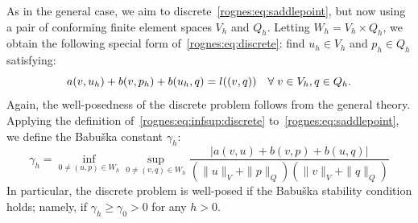 As in the general case, we aim to
discrete~\eqref{rognes:eq:saddlepoint}, but now using a pair of
conforming finite element spaces $V_h$ and $Q_h$. Letting $W_h = V_h
\times Q_h$, we obtain the following special form
of~\eqref{rognes:eq:discrete}: find $u_h \in V_h$ and $p_h \in Q_h$
satisfying:
\begin{equation}
    \label{rognes:eq:saddlepoint:discrete}
    a(v, u_h) + b(v, p_h) + b(u_h, q) = l((v, q))
    \quad \forall \; v \in V_h, q \in Q_h.
\end{equation}
Again, the well-posedness of the discrete problem follows from the
general theory. Applying the definition of~\eqref{rognes:eq:infsup:discrete}
to~\eqref{rognes:eq:saddlepoint}, we define the Babu\v ska constant
$\gamma_h$:
\begin{equation}
  \label{rognes:eq:Babuska}
  \gamma_h = \inf_{0 \not = (u, p) \in W_h} \sup_{0 \not = (v, q) \in W_h}
  \frac{|a(v, u) + b(v, p) + b(u, q)|} {(\|u\|_{V} + \|p\|_{Q})
    (\|v\|_{V} + \|q\|_{Q})}
\end{equation}
In particular, the discrete problem is well-posed if the Babu\v ska
stability condition holds; namely, if $\gamma_h \geq \gamma_0 > 0$ for
any $h > 0$.


